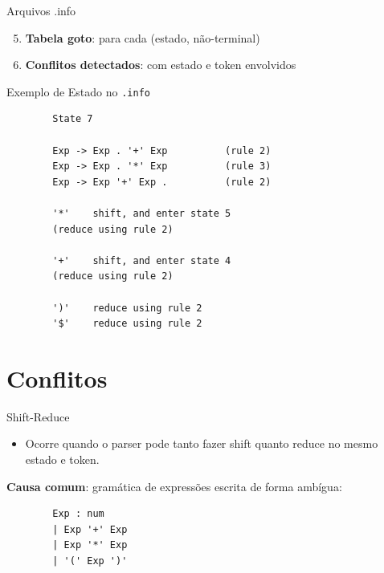 \begin{frame}{Arquivos .info}

    \begin{enumerate}
        \setcounter{enumi}{4}

        \item
        \textbf{Tabela goto}: para cada (estado, não-terminal)
        \item
        \textbf{Conflitos detectados}: com estado e token envolvidos
    \end{enumerate}
\end{frame}

\begin{frame}[fragile]{Exemplo de Estado no
    \texttt{.info}}

    \begin{lstlisting}
        State 7

        Exp -> Exp . '+' Exp          (rule 2)
        Exp -> Exp . '*' Exp          (rule 3)
        Exp -> Exp '+' Exp .          (rule 2)

        '*'    shift, and enter state 5
        (reduce using rule 2)

        '+'    shift, and enter state 4
        (reduce using rule 2)

        ')'    reduce using rule 2
        '$'    reduce using rule 2
    \end{lstlisting}
\end{frame}


\section{Conflitos}\label{conflitos}

\begin{frame}[fragile]{Shift-Reduce}

    \begin{itemize}

        \item
        Ocorre quando o parser pode tanto fazer shift quanto reduce no mesmo
        estado e token.
    \end{itemize}

    \textbf{Causa comum}: gramática de expressões escrita de forma ambígua:

    \begin{lstlisting}
        Exp : num
        | Exp '+' Exp
        | Exp '*' Exp
        | '(' Exp ')'
    \end{lstlisting}
\end{frame}

